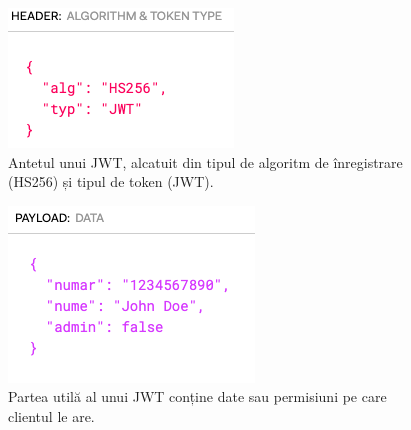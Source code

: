 \documentclass[12pt]{article}
\begin{document}
\begin{figure}[H]
    \begin{minipage}[c]{0.5\textwidth}
        \includegraphics[width=\textwidth]{jwt-header.png}
    \end{minipage}\hfill
    \begin{minipage}[c]{0.5\textwidth}
        \caption{Antetul unui JWT, alcatuit din tipul de algoritm 
        de înregistrare (HS256) și tipul de token (JWT).}
    \end{minipage}
\end{figure}

\begin{figure}[H]
    \begin{minipage}[c]{0.5\textwidth}
        \includegraphics[width=\textwidth]{jwt-payload.png}
    \end{minipage}\hfill
    \begin{minipage}[c]{0.5\textwidth}
        \caption{Partea utilă al unui JWT conține date sau permisiuni
        pe care clientul le are.}
    \end{minipage}
\end{figure}
\end{document}
